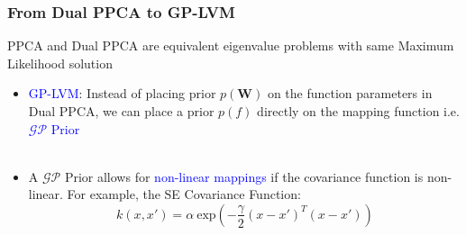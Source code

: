 \documentclass[10pt]{beamer}
\begin{document}
  \begin{frame}
  \frametitle{From Dual PPCA to GP-LVM}

  \begin{exampleblock}{}
    \centering
    PPCA and Dual PPCA are equivalent eigenvalue problems with same Maximum Likelihood solution
  \end{exampleblock}

  \begin{itemize}
    \item \textcolor{blue}{GP-LVM}: Instead of placing prior $p(\mathbf{W})$ on the function parameters in Dual PPCA, we can place a prior $p(f)$ directly on the mapping function i.e. \textcolor{blue}{$\mathcal{GP}$ Prior}\\~\\
    \item A $\mathcal{GP}$ Prior allows for \textcolor{blue}{non-linear mappings} if the covariance function is non-linear. For example, the SE Covariance Function:
      \begin{equation}
        k(x,x') = \alpha~\text{exp} \left( - \frac{\gamma}{2} (x - x')^T(x - x') \right)
      \end{equation}
  \end{itemize}

  \begin{figure}
    \centering
  \end{figure}

  \end{frame}
\end{document}
